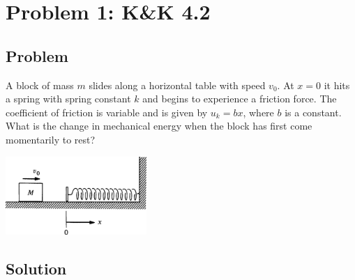 \documentclass[solutions]{esg8012pset}
\date{October 15}
\begin{document}
\section*{Problem 1: K\&K 4.2}
\subsection*{Problem}
  A block of mass $m$ slides along a horizontal table with speed $v_0$. At $x = 0$ it hits a spring with spring constant $k$ and begins to experience a friction force. The coefficient of friction is variable and is given by $u_k = bx$, where $b$ is a constant. What is the change in mechanical energy when the block has first come momentarily to rest?
  \begin{center}\includegraphics[width=0.4\textwidth]{ps06_1}\end{center}
\subsection*{Solution}
\end{document}

